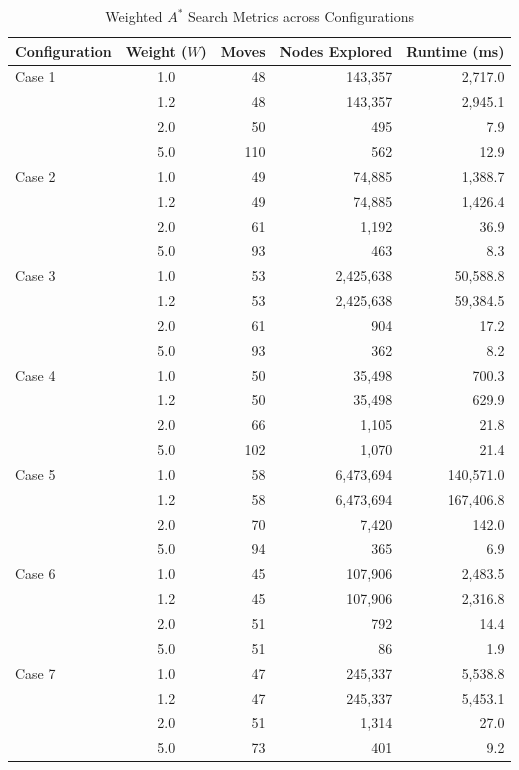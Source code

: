 \documentclass[11pt,a4paper]{article}
\begin{document}
\begin{table}[H]
\centering
\caption{Weighted $A^*$ Search Metrics across Configurations}
\label{tab:metrics}
\small
\begin{tabular}{lcrrr}
\toprule
\textbf{Configuration} & \textbf{Weight ($W$)} & \textbf{Moves} & \textbf{Nodes Explored} & \textbf{Runtime (ms)} \\
\midrule
Case 1 & 1.0 & 48 & 143,357 & 2,717.0 \\
       & 1.2 & 48 & 143,357 & 2,945.1 \\
       & 2.0 & 50 & 495 & 7.9 \\
       & 5.0 & 110 & 562 & 12.9 \\
\midrule
Case 2 & 1.0 & 49 & 74,885 & 1,388.7 \\
       & 1.2 & 49 & 74,885 & 1,426.4 \\
       & 2.0 & 61 & 1,192 & 36.9 \\
       & 5.0 & 93 & 463 & 8.3 \\
\midrule
Case 3 & 1.0 & 53 & 2,425,638 & 50,588.8 \\
       & 1.2 & 53 & 2,425,638 & 59,384.5 \\
       & 2.0 & 61 & 904 & 17.2 \\
       & 5.0 & 93 & 362 & 8.2 \\
\midrule
Case 4 & 1.0 & 50 & 35,498 & 700.3 \\
       & 1.2 & 50 & 35,498 & 629.9 \\
       & 2.0 & 66 & 1,105 & 21.8 \\
       & 5.0 & 102 & 1,070 & 21.4 \\
\midrule
Case 5 & 1.0 & 58 & 6,473,694 & 140,571.0 \\
       & 1.2 & 58 & 6,473,694 & 167,406.8 \\
       & 2.0 & 70 & 7,420 & 142.0 \\
       & 5.0 & 94 & 365 & 6.9 \\
\midrule
Case 6 & 1.0 & 45 & 107,906 & 2,483.5 \\
       & 1.2 & 45 & 107,906 & 2,316.8 \\
       & 2.0 & 51 & 792 & 14.4 \\
       & 5.0 & 51 & 86 & 1.9 \\
\midrule
Case 7 & 1.0 & 47 & 245,337 & 5,538.8 \\
       & 1.2 & 47 & 245,337 & 5,453.1 \\
       & 2.0 & 51 & 1,314 & 27.0 \\
       & 5.0 & 73 & 401 & 9.2 \\

\end{tabular}
\end{table}
\end{document}

